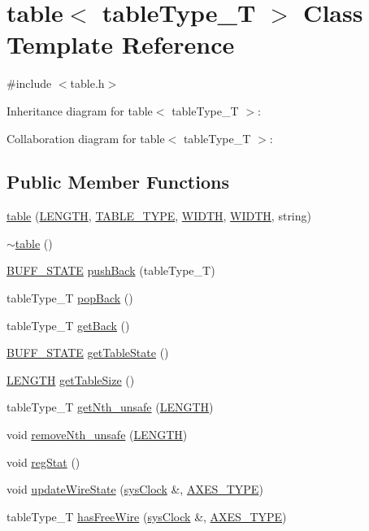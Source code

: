 \hypertarget{classtable}{
\section{table$<$ tableType\_\-T $>$ Class Template Reference}
\label{classtable}
}


{\ttfamily \#include $<$table.h$>$}



Inheritance diagram for table$<$ tableType\_\-T $>$:


Collaboration diagram for table$<$ tableType\_\-T $>$:
\subsection*{Public Member Functions}
\begin{DoxyCompactItemize}
\item 
\hyperlink{classtable_a5b99bb95a41d31c95bcf2c91c784f981}{table} (\hyperlink{global_2global_8h_ad7ec63c69447a2b630929c8e0197860d}{LENGTH}, \hyperlink{table_8h_ae42c42cf2da8a8d43c157d91ad4f3158}{TABLE\_\-TYPE}, \hyperlink{global_2global_8h_a6fa2e24b8a418fa215e183264cbea3aa}{WIDTH}, \hyperlink{global_2global_8h_a6fa2e24b8a418fa215e183264cbea3aa}{WIDTH}, string)
\item 
\hyperlink{classtable_a2d08b3fd77985dc4dc610de35946a293}{$\sim$table} ()
\item 
\hyperlink{global_2global_8h_a8bd4ea2582a6025c1cfe99bf9947489c}{BUFF\_\-STATE} \hyperlink{classtable_a8810ab4eeba365c36687d4c6c02fe1f6}{pushBack} (tableType\_\-T)
\item 
tableType\_\-T \hyperlink{classtable_a2fbaa1bd5450556efff7dddd33e5b6d1}{popBack} ()
\item 
tableType\_\-T \hyperlink{classtable_a9a0482a7594596a539e815bbe9c6aa7b}{getBack} ()
\item 
\hyperlink{global_2global_8h_a8bd4ea2582a6025c1cfe99bf9947489c}{BUFF\_\-STATE} \hyperlink{classtable_abab8f70b8b32bb7342f5107edb328d18}{getTableState} ()
\item 
\hyperlink{global_2global_8h_ad7ec63c69447a2b630929c8e0197860d}{LENGTH} \hyperlink{classtable_af9c07419ae48bd029f03a9e7ca29c43f}{getTableSize} ()
\item 
tableType\_\-T \hyperlink{classtable_a20191b8e05f6882b38655c5fffb42389}{getNth\_\-unsafe} (\hyperlink{global_2global_8h_ad7ec63c69447a2b630929c8e0197860d}{LENGTH})
\item 
void \hyperlink{classtable_ae5c57c137b681a823a1bb0d830520e82}{removeNth\_\-unsafe} (\hyperlink{global_2global_8h_ad7ec63c69447a2b630929c8e0197860d}{LENGTH})
\item 
void \hyperlink{classtable_af252520f4025cbc80e7bff8d9b811ba7}{regStat} ()
\item 
void \hyperlink{classtable_aafcfb08640fda68a1a09b81afc3c1dd7}{updateWireState} (\hyperlink{classsysClock}{sysClock} \&, \hyperlink{binaryTranslator_2global_8h_a94b8423a23b95a7adac22848b81e7c0c}{AXES\_\-TYPE})
\item 
tableType\_\-T \hyperlink{classtable_ade9af281ee70b0cf544060c478ffbfe1}{hasFreeWire} (\hyperlink{classsysClock}{sysClock} \&, \hyperlink{binaryTranslator_2global_8h_a94b8423a23b95a7adac22848b81e7c0c}{AXES\_\-TYPE})
\end{DoxyCompactItemize}
